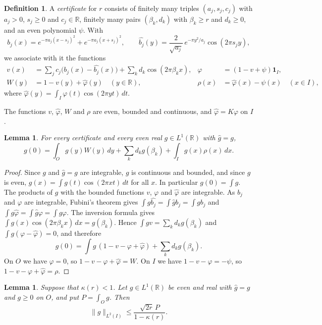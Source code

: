 \documentclass[11pt]{amsart}
\newtheorem{lemma}[theorem]{Lemma}
\theoremstyle{definition}
\newtheorem{definition}[theorem]{Definition}
\theoremstyle{remark}
\numberwithin{equation}{section}
\newcommand{\R}{\mathbb{R}}
\newcommand{\one}{\mathbf{1}}
\newcommand{\ft}[1]{\widehat{#1}}
\begin{document}
\begin{definition}\label{def:cert}
A \emph{certificate} for $r$ consists of finitely many triples $(a_j,s_j,c_j)$ with $a_j>0$, $s_j\ge0$ and $c_j\in\R$, finitely many pairs $(\beta_k,d_k)$ with $\beta_k\ge r$ and $d_k\ge0$, and an even polynomial $\psi$. With
\[
b_j(x)=e^{-\pi a_j(x-s_j)^2}+e^{-\pi a_j(x+s_j)^2},\qquad \ft{b_j}(y)=\frac{2}{\sqrt{a_j}}\,e^{-\pi y^2/a_j}\cos(2\pi s_jy),
\]
we associate with it the functions
\begin{align*}
v(x)&=\sum_jc_j\bigl(b_j(x)-\ft{b_j}(x)\bigr)+\sum_kd_k\cos(2\pi\beta_kx), & \varphi&=(1-v+\psi)\one_I,\\
W(y)&=1-v(y)+\ft\varphi(y)\quad(y\in\R), & \rho(x)&=\ft\varphi(x)-\psi(x)\quad(x\in I),
\end{align*}
where $\ft\varphi(y)=\int_I\varphi(t)\cos(2\pi yt)\,dt$.
\end{definition}

The functions $v$, $\ft\varphi$, $W$ and $\rho$ are even, bounded and continuous, and $\ft\varphi=K\varphi$ on $I$.

\begin{lemma}\label{lem:identity}
For every certificate and every even real $g\in L^1(\R)$ with $\ft g=g$,
\begin{equation}\label{eq:identity}
g(0)=\int_Og(y)W(y)\,dy+\sum_kd_kg(\beta_k)+\int_Ig(x)\rho(x)\,dx.
\end{equation}
\end{lemma}

\begin{proof}
Since $g$ and $\ft g=g$ are integrable, $g$ is continuous and bounded, and since $g$ is even, $g(x)=\int g(t)\cos(2\pi xt)\,dt$ for all $x$. In particular $g(0)=\int g$. The products of $g$ with the bounded functions $v$, $\varphi$ and $\ft\varphi$ are integrable. As $b_j$ and $\varphi$ are integrable, Fubini's theorem gives $\int g\ft{b_j}=\int\ft gb_j=\int gb_j$ and $\int g\ft\varphi=\int\ft g\varphi=\int g\varphi$. The inversion formula gives $\int g(x)\cos(2\pi\beta_kx)\,dx=g(\beta_k)$. Hence $\int gv=\sum_kd_kg(\beta_k)$ and $\int g(\varphi-\ft\varphi)=0$, and therefore
\[
g(0)=\int g\,(1-v-\varphi+\ft\varphi)+\sum_kd_kg(\beta_k).
\]
On $O$ we have $\varphi=0$, so $1-v-\varphi+\ft\varphi=W$. On $I$ we have $1-v-\varphi=-\psi$, so $1-v-\varphi+\ft\varphi=\rho$.
\end{proof}

\begin{lemma}\label{lem:apriori}
Suppose that $\kappa(r)<1$. Let $g\in L^1(\R)$ be even and real with $\ft g=g$ and $g\ge0$ on $O$, and put $P=\int_Og$. Then
\[
\|g\|_{L^2(I)}\le\frac{\sqrt{2r}\,P}{1-\kappa(r)}.
\]
\end{lemma}
\end{document}
